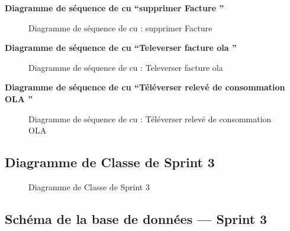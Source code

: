 \documentclass[a4paper,11pt]{report}
\begin{document}
\newpage
\textbf{ Diagramme de séquence de cu “supprimer Facture ”}

\begin{figure}[H]
  \centering
  \setlength{\fboxrule}{1pt}
  \setlength{\fboxsep}{3pt}
  \caption{ Diagramme de séquence de cu : supprimer Facture 
 }
  \label{fig:clone-result}
\end{figure}


\newpage
\textbf{ Diagramme de séquence de cu “Televerser facture ola ”}

\begin{figure}[H]
  \centering
  \setlength{\fboxrule}{1pt}
  \setlength{\fboxsep}{3pt}
  \caption{ Diagramme de séquence de cu : Televerser facture ola
 }
  \label{fig:clone-result}
\end{figure}


\newpage
\textbf{ Diagramme de séquence de cu “Téléverser relevé de consommation OLA ”}

\begin{figure}[H]
  \centering
  \setlength{\fboxrule}{1pt}
  \setlength{\fboxsep}{3pt}
  \caption{ Diagramme de séquence de cu : Téléverser relevé de consommation OLA
 }
  \label{fig:clone-result}
\end{figure}


\subsection{Diagramme de Classe de Sprint 3}



\begin{figure}[H]
  \centering
  \setlength{\fboxrule}{1pt}
  \setlength{\fboxsep}{3pt}
  \caption{ Diagramme de Classe de Sprint 3
 }
  \label{fig:clone-result}
\end{figure}
\subsection{Schéma de la base de données — Sprint 3}
\end{document}
